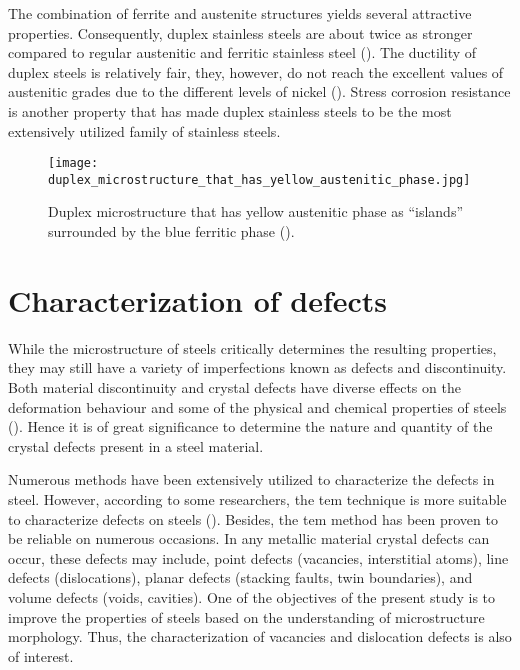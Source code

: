 The combination of ferrite and austenite structures yields several attractive properties. Consequently, duplex stainless steels are about twice as stronger compared to regular austenitic and ferritic stainless steel (\cite{davison1991guide}). The ductility of duplex steels is relatively fair, they, however, do not reach the excellent values of austenitic grades due to the different levels of nickel (\cite{molabe2018determining}). Stress corrosion resistance is another property that has made duplex stainless steels to be the most extensively utilized family of stainless steels. 

\begin{figure}[H]
    \centering
    \texttt{[image: duplex\_microstructure\_that\_has\_yellow\_austenitic\_phase.jpg]}
    \caption{Duplex microstructure that has yellow austenitic phase as “islands” surrounded by the blue ferritic phase (\cite{davison1991guide}).}
    \label{ch3:figure:duplex_microstructure}
\end{figure}

\section{Characterization of defects} 
While the microstructure of steels critically determines the resulting properties, they may still have a variety of imperfections known as defects and discontinuity. Both material discontinuity and crystal defects have diverse effects on the deformation behaviour and some of the physical and chemical properties of steels (\cite{suryanarayana2017microstructure}). Hence it is of great significance to determine the nature and quantity of the crystal defects present in a steel material. 

Numerous methods have been extensively utilized to characterize the defects in steel. However, according to some researchers, the \Acrfull{tem} technique is more suitable to characterize defects on steels (\cite{george2002introduction, bhadeshia2017steels}). Besides, the \acrshort{tem} method has been proven to be reliable on numerous occasions. In any metallic material crystal defects can occur, these defects may include, point defects (vacancies, interstitial atoms), line defects (dislocations), planar defects (stacking faults, twin boundaries), and volume defects (voids, cavities). One of the objectives of the present study is to improve the properties of steels based on the understanding of microstructure morphology. Thus, the characterization of vacancies and dislocation defects is also of interest.

